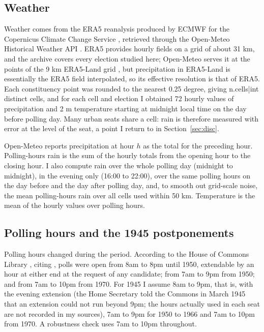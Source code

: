 \documentclass[11pt,a4paper]{article}
\begin{document}
\subsection{Weather}
Weather comes from the ERA5 reanalysis produced by ECMWF for the Copernicus Climate Change Service \citep{hersbach2020}, retrieved through the Open-Meteo Historical Weather API \citep{zippenfenig2023}. ERA5 provides hourly fields on a grid of about 31 km, and the archive covers every election studied here; Open-Meteo serves it at the points of the 9 km ERA5-Land grid \citep{munozsabater2021}, but precipitation in ERA5-Land is essentially the ERA5 field interpolated, so its effective resolution is that of ERA5. Each constituency point was rounded to the nearest 0.25 degree, giving {{n.cells|int}} distinct cells, and for each cell and election I obtained 72 hourly values of precipitation and 2 m temperature starting at midnight local time on the day before polling day. Many urban seats share a cell: rain is therefore measured with error at the level of the seat, a point I return to in Section~\ref{sec:disc}.

Open-Meteo reports precipitation at hour $h$ as the total for the preceding hour. Polling-hours rain is the sum of the hourly totals from the opening hour to the closing hour. I also compute rain over the whole polling day (midnight to midnight), in the evening only (16:00 to 22:00), over the same polling hours on the day before and the day after polling day, and, to smooth out grid-scale noise, the mean polling-hours rain over all cells used within 50 km. Temperature is the mean of the hourly values over polling hours.

\subsection{Polling hours and the 1945 postponements}
Polling hours changed during the period. According to the House of Commons Library \citep{white2012}, citing \citet{ralling2007}, polls were open from 8am to 8pm until 1950, extendable by an hour at either end at the request of any candidate; from 7am to 9pm from 1950; and from 7am to 10pm from 1970. For 1945 I assume 8am to 9pm, that is, with the evening extension (the Home Secretary told the Commons in March 1945 that an extension could not run beyond 9pm; the hours actually used in each seat are not recorded in my sources), 7am to 9pm for 1950 to 1966 and 7am to 10pm from 1970. A robustness check uses 7am to 10pm throughout.
\end{document}
